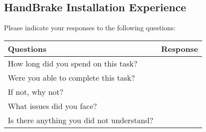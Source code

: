 \subsection{HandBrake Installation Experience}

Please indicate your responses to the following questions:

\begin{table}[h]
\centering
\renewcommand{\arraystretch}{1.5} %
\begin{tabularx}{\textwidth}{|X|X|} %
\hline
\textbf{Questions} & \textbf{Response} \\ \hline
How long did you spend on this task? &  \\ \hline
Were you able to complete this task? & \\ \hline
If not, why not? & \\ \hline
What issues did you face? &\\ \hline
Is there anything you did not understand? &\\ \hline
\end{tabularx}
\end{table}